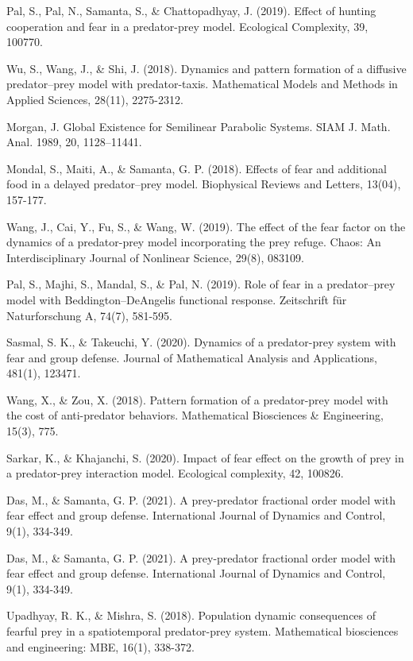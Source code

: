 \documentclass[10pt]{amsart}
\theoremstyle{definition}
\begin{document}
\begin{thebibliography}{}
 Pal, S., Pal, N., Samanta, S., \& Chattopadhyay, J. (2019). Effect of hunting cooperation and fear in a predator-prey model. Ecological Complexity, 39, 100770.


 Wu, S., Wang, J., \& Shi, J. (2018). Dynamics and pattern formation of a diffusive predator–prey model with predator-taxis. Mathematical Models and Methods in Applied Sciences, 28(11), 2275-2312.

Morgan, J. Global Existence for Semilinear Parabolic Systems. SIAM J. Math. Anal. 1989, 20, 1128–11441. 


 Mondal, S., Maiti, A., \& Samanta, G. P. (2018). Effects of fear and additional food in a delayed predator–prey model. Biophysical Reviews and Letters, 13(04), 157-177.


 Wang, J., Cai, Y., Fu, S., \& Wang, W. (2019). The effect of the fear factor on the dynamics of a predator-prey model incorporating the prey refuge. Chaos: An Interdisciplinary Journal of Nonlinear Science, 29(8), 083109.

 Pal, S., Majhi, S., Mandal, S., \& Pal, N. (2019). Role of fear in a predator–prey model with Beddington–DeAngelis functional response. Zeitschrift für Naturforschung A, 74(7), 581-595.

 Sasmal, S. K., \& Takeuchi, Y. (2020). Dynamics of a predator-prey system with fear and group defense. Journal of Mathematical Analysis and Applications, 481(1), 123471.

 Wang, X., \& Zou, X. (2018). Pattern formation of a predator-prey model with the cost of anti-predator behaviors. Mathematical Biosciences \& Engineering, 15(3), 775.


 Sarkar, K., \& Khajanchi, S. (2020). Impact of fear effect on the growth of prey in a predator-prey interaction model. Ecological complexity, 42, 100826.

 Das, M., \& Samanta, G. P. (2021). A prey-predator fractional order model with fear effect and group defense. International Journal of Dynamics and Control, 9(1), 334-349.

 Das, M., \& Samanta, G. P. (2021). A prey-predator fractional order model with fear effect and group defense. International Journal of Dynamics and Control, 9(1), 334-349.

 Upadhyay, R. K., \& Mishra, S. (2018). Population dynamic consequences of fearful prey in a spatiotemporal predator-prey system. Mathematical biosciences and engineering: MBE, 16(1), 338-372.


\end{thebibliography}
\end{document}
